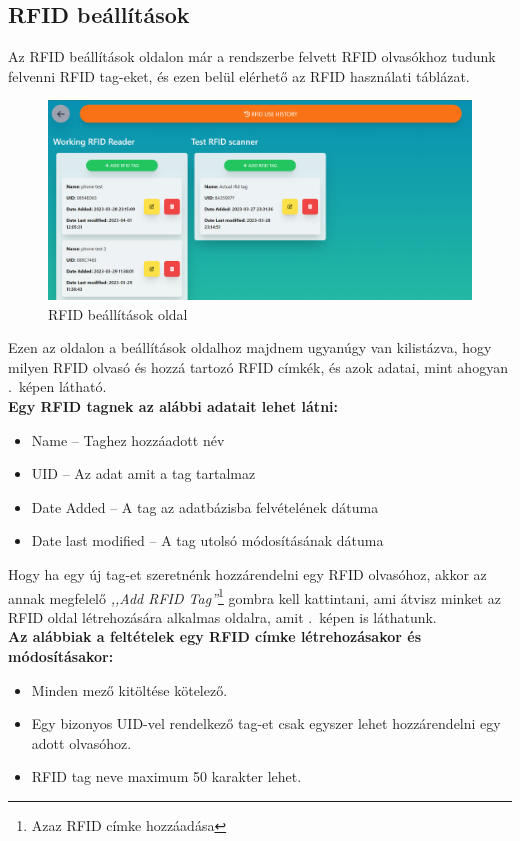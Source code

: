 \documentclass[
]{thesis-ekf}
\theoremstyle{definition}
\theoremstyle{remark}
\begin{document}
	\subsection{RFID beállítások}
	
	Az RFID beállítások oldalon már a rendszerbe felvett RFID olvasókhoz tudunk felvenni RFID tag-eket, és ezen belül elérhető az RFID használati táblázat.\\
	\begin{figure}[ht!]
		\centering
		\includegraphics[width=1\textwidth]{./src/pages_img/rfid-settings}
		\caption{RFID beállítások oldal}
		\label{rfid-settings}
	\end{figure}
	Ezen az oldalon a beállítások oldalhoz majdnem ugyanúgy van kilistázva, hogy milyen RFID olvasó és hozzá tartozó RFID címkék, és azok adatai, mint ahogyan .~képen látható.\\
	\textbf{Egy RFID tagnek az alábbi adatait lehet látni:}
	\begin{itemize}
		\item Name -- Taghez hozzáadott név
		\item UID -- Az adat amit a tag tartalmaz
		\item Date Added -- A tag az adatbázisba felvételének dátuma
		\item Date last modified -- A tag utolsó módosításának dátuma
	\end{itemize}
	Hogy ha egy új tag-et szeretnénk hozzárendelni egy RFID olvasóhoz, akkor az annak megfelelő \emph{,,Add RFID Tag''}\footnote{Azaz RFID címke hozzáadása} gombra kell kattintani, ami átvisz minket az RFID oldal létrehozására alkalmas oldalra, amit .~képen is láthatunk.\\
	\textbf{Az alábbiak a feltételek egy RFID címke létrehozásakor és módosításakor:}
	\begin{itemize}
		\item Minden mező kitöltése kötelező.
		\item Egy bizonyos UID-vel rendelkező tag-et csak egyszer lehet hozzárendelni egy adott olvasóhoz.
		\item RFID tag neve maximum 50 karakter lehet.
	\end{itemize}
	
\end{document}
